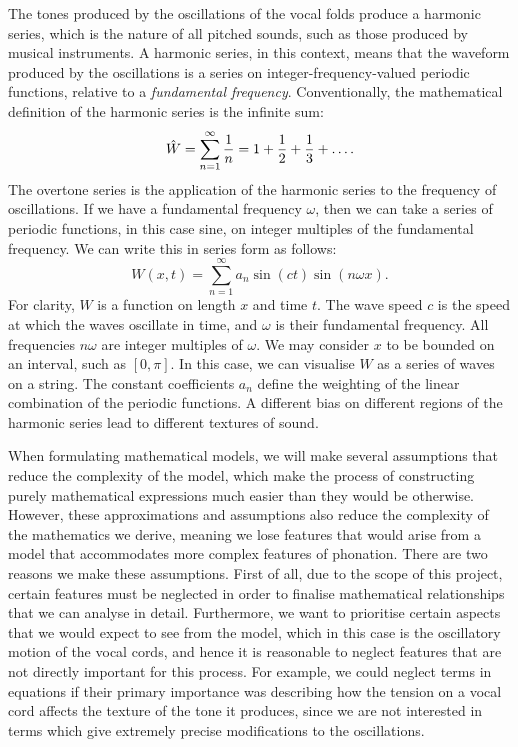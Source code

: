 \documentclass{report}
\begin{document}
The tones produced by the oscillations of the vocal folds produce a harmonic series,
which is the nature of all pitched sounds, such as those produced by musical instruments.
A harmonic series, in this context,
means that the waveform produced by the oscillations is a series on integer-frequency-valued periodic functions,
relative to a \textit{fundamental frequency}.
Conventionally, the mathematical definition of the harmonic series is the infinite sum:
\begin{equation*}
    \hat{W} = \sum_{n=1}^{\infty}\frac{1}{n} = 1 + \frac{1}{2} + \frac{1}{3} + \mathellipsis.
\end{equation*}
The overtone series is the application of the harmonic series to the frequency of oscillations.
If we have a fundamental frequency $\omega$, then we can take a series of periodic functions, in this case sine,
on integer multiples of the fundamental frequency.
We can write this in series form as follows:
\begin{equation*}
    W(x,t) = \sum_{n=1}^{\infty}a_n \sin(ct) \sin(n \omega x).
\end{equation*}
For clarity, $W$ is a function on length $x$ and time $t$.
The wave speed $c$ is the speed at which the waves oscillate in time,
and $\omega$ is their fundamental frequency.
All frequencies $n\omega$ are integer multiples of $\omega$.
We may consider $x$ to be bounded on an interval, such as $[0, \pi]$.
In this case, we can visualise $W$ as a series of waves on a string.
The constant coefficients $a_n$ define the weighting of the linear combination of the periodic functions.
A different bias on different regions of the harmonic series lead to different textures of sound.

When formulating mathematical models,
we will make several assumptions that reduce the complexity of the model,
which make the process of constructing purely mathematical expressions much easier than they would be otherwise.
However, these approximations and assumptions also reduce the complexity of the mathematics we derive,
meaning we lose features that would arise from a model that accommodates more complex features of phonation.
There are two reasons we make these assumptions.
First of all, due to the scope of this project,
certain features must be neglected in order to finalise mathematical relationships that we can analyse in detail.
Furthermore, we want to prioritise certain aspects that we would expect to see from the model,
which in this case is the oscillatory motion of the vocal cords,
and hence it is reasonable to neglect features that are not directly important for this process.
For example, we could neglect terms in equations if their primary importance was describing how the tension on a vocal cord affects the texture of the tone it produces,
since we are not interested in terms which give extremely precise modifications to the oscillations.
\end{document}
